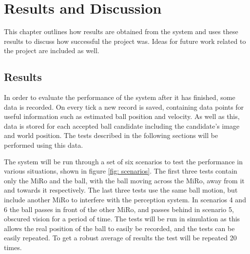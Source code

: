 \chapter{Results and Discussion}
\label{chapter: 6}

This chapter outlines how results are obtained from the system and uses these results to discuss how successful the project was. Ideas for future work related to the project are included as well. 

\section{Results}

In order to evaluate the performance of the system after it has finished, some data is recorded. On every tick a new record is saved, containing data points for useful information such as estimated ball position and velocity. As well as this, data is stored for each accepted ball candidate including the candidate's image and world position. The tests described in the following sections will be performed using this data. 

The system will be run through a set of six scenarios to test the performance in various situations, shown in figure \ref{fig: scenarios}. The first three tests contain only the MiRo and the ball, with the ball moving across the MiRo, away from it and towards it respectively. The last three tests use the same ball motion, but include another MiRo to interfere with the perception system. In scenarios 4 and 6 the ball passes in front of the other MiRo, and passes behind in scenario 5, obscured vision for a period of time. The tests will be run in simulation as this allows the real position of the ball to easily be recorded, and the tests can be easily repeated. To get a robust average of results the test will be repeated 20 times. 

